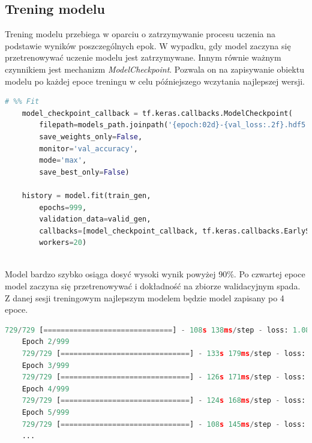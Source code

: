 \documentclass[a4paper,12pt,oneside]{book} %
\begin{document}
\subsection{Trening modelu}

Trening modelu przebiega w oparciu o zatrzymywanie procesu uczenia na podstawie wyników poszczególnych epok. W wypadku, gdy model zaczyna się przetrenowywać uczenie modelu jest zatrzymywane. Innym równie ważnym czynnikiem jest mechanizm \emph{ModelCheckpoint}. Pozwala on na zapisywanie obiektu modelu po każdej epoce treningu w celu późniejszego wczytania najlepszej wersji.

\begin{lstlisting}[language=Python, caption={Trening modelu i mechanizmy \emph{Callback}}, label={lst:modeltrain}]
	# %% Fit
	model_checkpoint_callback = tf.keras.callbacks.ModelCheckpoint(
		filepath=models_path.joinpath('{epoch:02d}-{val_loss:.2f}.hdf5'),
		save_weights_only=False,
		monitor='val_accuracy',
		mode='max',
		save_best_only=False)
	
	history = model.fit(train_gen,
		epochs=999,
		validation_data=valid_gen,
		callbacks=[model_checkpoint_callback, tf.keras.callbacks.EarlyStopping(patience=2)],
		workers=20)
	
\end{lstlisting}

Model bardzo szybko osiąga dosyć wysoki wynik powyżej 90\%. Po czwartej epoce model zaczyna się przetrenowywać i dokładność na zbiorze walidacyjnym spada. Z danej sesji treningowym najlepszym modelem będzie model zapisany po 4 epoce.

\begin{lstlisting}[language=Python, caption={Przykładowy trening modelu}, label={lst:modeltrainsession}]
	729/729 [==============================] - 108s 138ms/step - loss: 1.0876 - accuracy: 0.6626 - val_loss: 0.4911 - val_accuracy: 0.8657
	Epoch 2/999
	729/729 [==============================] - 133s 179ms/step - loss: 0.1650 - accuracy: 0.9452 - val_loss: 0.4953 - val_accuracy: 0.8691
	Epoch 3/999
	729/729 [==============================] - 126s 171ms/step - loss: 0.0786 - accuracy: 0.9738 - val_loss: 0.3581 - val_accuracy: 0.9114
	Epoch 4/999
	729/729 [==============================] - 124s 168ms/step - loss: 0.0497 - accuracy: 0.9839 - val_loss: 0.3348 - val_accuracy: 0.9203
	Epoch 5/999
	729/729 [==============================] - 108s 145ms/step - loss: 0.0386 - accuracy: 0.9871 - val_loss: 0.3579 - val_accuracy: 0.9043
	...
\end{lstlisting}
\end{document}
